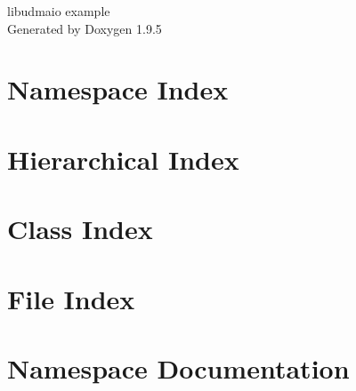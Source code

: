 \documentclass[twoside]{book}
\newcommand{\+}{\discretionary{\mbox{\scriptsize$\hookleftarrow$}}{}{}}
\newcommand{\clearemptydoublepage}{%
    \newpage{\pagestyle{empty}\cleardoublepage}%
  }
\begin{document}
  \raggedbottom
    \hypersetup{pageanchor=false,
                bookmarksnumbered=true,
                pdfencoding=unicode
               }
  \begin{titlepage}
  \vspace*{7cm}
  \begin{center}%
  {\Large libudmaio example}\\
  \vspace*{1cm}
  {\large Generated by Doxygen 1.9.5}\\
  \end{center}
  \end{titlepage}
  \clearemptydoublepage
  \tableofcontents
  \clearemptydoublepage
  \hypersetup{pageanchor=true}
\chapter{Namespace Index}

\chapter{Hierarchical Index}

\chapter{Class Index}

\chapter{File Index}

\chapter{Namespace Documentation}




\end{document}
